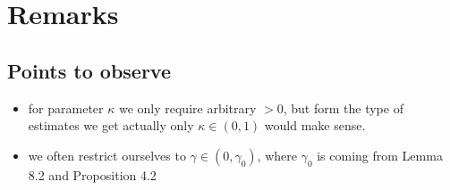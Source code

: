\documentclass{report}
\theoremstyle{remark}
\theoremstyle{definition}
\begin{document}
\chapter{Remarks}
\section{Points to observe}
\begin{itemize}
  \item for parameter $\kappa$ we only require arbitrary $> 0$, but form the type of estimates we get actually only $\kappa \in (0, 1)$ would make sense.
  \item we often restrict ourselves to $\gamma \in (0, \gamma_0)$, where $\gamma_0$ is coming from Lemma 8.2 and Proposition 4.2
\end{itemize}

\medskip
\printbibliography
\end{document}
